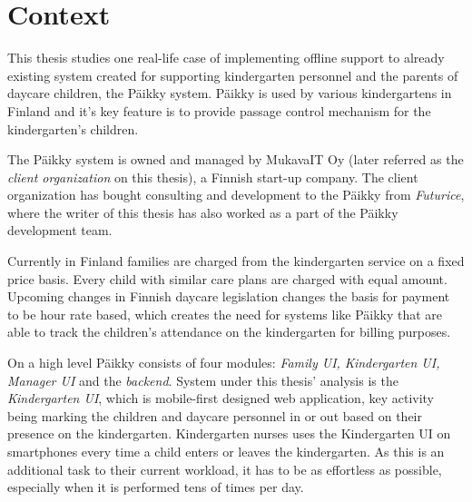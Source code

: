 



\section{Context}
This thesis studies one real-life case of implementing offline support to already existing system created for supporting kindergarten personnel and the parents of daycare children, the Päikky system. Päikky is used by various kindergartens in Finland and it's key feature is to provide passage control mechanism for the kindergarten's children.

The Päikky system is owned and managed by MukavaIT Oy (later referred as the \textit{client organization} on this thesis), a Finnish start-up company. The client organization has bought consulting and development to the Päikky from \textit{Futurice}, where the writer of this thesis has also worked as a part of the Päikky development team.

Currently in Finland families are charged from the kindergarten service on a fixed price basis. Every child with similar care plans are charged with equal amount. Upcoming changes in Finnish daycare legislation changes the basis for payment to be hour rate based, which creates the need for systems like Päikky that are able to track the children's attendance on the kindergarten for billing purposes. %

On a high level Päikky consists of four modules: \textit{Family UI, Kindergarten UI, Manager UI} and the \textit{backend}. System under this thesis' analysis is the \textit{Kindergarten UI}, which is mobile-first designed web application, key activity being marking the children and daycare personnel in or out based on their presence on the kindergarten. Kindergarten nurses uses the Kindergarten UI on smartphones every time a child enters or leaves the kindergarten. As this is an additional task to their current workload, it has to be as effortless as possible, especially when it is performed tens of times per day. %

